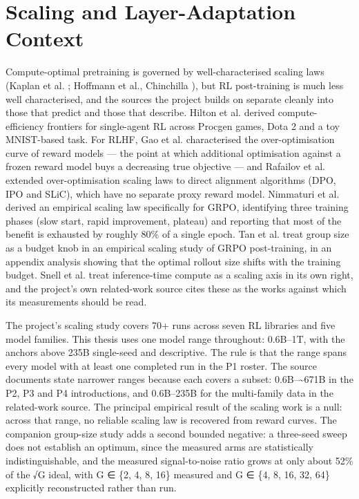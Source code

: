\documentclass[12pt,a4paper]{report}
\begin{document}
\section{Scaling and Layer-Adaptation
Context}\label{scaling-and-layer-adaptation-context}

Compute-optimal pretraining is governed by well-characterised scaling
laws (Kaplan et al. \citep{kaplan2020scaling}; Hoffmann et al.,
Chinchilla \citep{hoffmann2022chinchilla}), but RL post-training is much
less well characterised, and the sources the project builds on separate
cleanly into those that predict and those that describe. Hilton et al.
\citep{hilton2023rlscaling} derived compute-efficiency frontiers for
single-agent RL across Procgen games, Dota 2 and a toy MNIST-based task.
For RLHF, Gao et al. \citep{gao2023scaling} characterised the
over-optimisation curve of reward models --- the point at which
additional optimisation against a frozen reward model buys a decreasing
true objective --- and Rafailov et al. \citep{rafailov2024rlhfscaling}
extended over-optimisation scaling laws to direct alignment algorithms
(DPO, IPO and SLiC), which have no separate proxy reward model.
Nimmaturi et al. \citep{nimmaturi2025predictive} derived an empirical
scaling law specifically for GRPO, identifying three training phases
(slow start, rapid improvement, plateau) and reporting that most of the
benefit is exhausted by roughly 80\% of a single epoch. Tan et al.
\citep{tan2025scalingrl} treat group size as a budget knob in an
empirical scaling study of GRPO post-training, in an appendix analysis
showing that the optimal rollout size shifts with the training budget.
Snell et al. \citep{snell2024testtime} treat inference-time compute as a
scaling axis in its own right, and the project's own related-work source
cites these as the works against which its measurements should be read.

The project's scaling study covers 70+ runs across seven RL libraries
and five model families. This thesis uses one model range throughout:
0.6B--1T, with the anchors above 235B single-seed and descriptive. The
rule is that the range spans every model with at least one completed run
in the P1 roster. The source documents state narrower ranges because
each covers a subset: 0.6B--\textasciitilde671B in the P2, P3 and P4
introductions, and 0.6B--235B for the multi-family data in the
related-work source. The principal empirical result of the scaling work
is a null: across that range, no reliable scaling law is recovered from
reward curves. The companion group-size study adds a second bounded
negative: a three-seed sweep does not establish an optimum, since the
measured arms are statistically indistinguishable, and the measured
signal-to-noise ratio grows at only about 52\% of the √G ideal, with G ∈
\{2, 4, 8, 16\} measured and G ∈ \{4, 8, 16, 32, 64\} explicitly
reconstructed rather than run.
\end{document}
